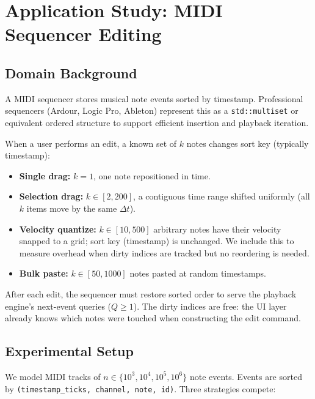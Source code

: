 \section{Application Study: MIDI Sequencer Editing}
\label{sec:midi}

\subsection{Domain Background}

A MIDI sequencer stores musical note events sorted by timestamp.
Professional sequencers (Ardour, Logic Pro, Ableton) represent this as
a \texttt{std::multiset} or equivalent ordered structure to support
efficient insertion and playback iteration.

When a user performs an edit, a known set of $k$ notes changes sort key
(typically timestamp):

\begin{itemize}
  \item \textbf{Single drag:} $k=1$, one note repositioned in time.
  \item \textbf{Selection drag:} $k \in [2, 200]$, a contiguous time range
    shifted uniformly (all $k$ items move by the same $\Delta t$).
  \item \textbf{Velocity quantize:} $k \in [10, 500]$ arbitrary notes
    have their velocity snapped to a grid; sort key (timestamp) is unchanged.
    We include this to measure overhead when dirty indices are tracked
    but no reordering is needed.
  \item \textbf{Bulk paste:} $k \in [50, 1000]$ notes pasted at random timestamps.
\end{itemize}

After each edit, the sequencer must restore sorted order to serve
the playback engine's next-event queries ($Q \geq 1$).
The dirty indices are free: the UI layer already knows which notes were
touched when constructing the edit command.

\subsection{Experimental Setup}

We model MIDI tracks of $n \in \{10^3, 10^4, 10^5, 10^6\}$ note events.
Events are sorted by \texttt{(timestamp\_ticks, channel, note, id)}.
Three strategies compete:

